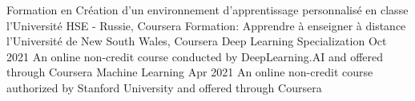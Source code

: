 %
%
%


\begin{scholarship}
	{Formation en Création d'un environnement d'apprentissage personnalisé en classe l'Université HSE - Russie, Coursera} %
	{Formation: Apprendre à enseigner à distance l'Université de New South Wales, Coursera} %
Deep Learning Specialization Oct 2021
An online non-credit course conducted by DeepLearning.AI and offered through Coursera
Machine Learning Apr 2021
An online non-credit course authorized by Stanford University and offered through Coursera
\end{scholarship}
